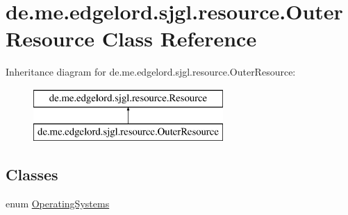\hypertarget{classde_1_1me_1_1edgelord_1_1sjgl_1_1resource_1_1_outer_resource}{}\section{de.\+me.\+edgelord.\+sjgl.\+resource.\+Outer\+Resource Class Reference}
\label{classde_1_1me_1_1edgelord_1_1sjgl_1_1resource_1_1_outer_resource}
Inheritance diagram for de.\+me.\+edgelord.\+sjgl.\+resource.\+Outer\+Resource\+:\begin{figure}[H]
\begin{center}
\leavevmode
\includegraphics[height=2.000000cm]{classde_1_1me_1_1edgelord_1_1sjgl_1_1resource_1_1_outer_resource}
\end{center}
\end{figure}
\subsection*{Classes}
\begin{DoxyCompactItemize}
\item 
enum \mbox{\hyperlink{enumde_1_1me_1_1edgelord_1_1sjgl_1_1resource_1_1_outer_resource_1_1_operating_systems}{Operating\+Systems}}
\end{DoxyCompactItemize}
